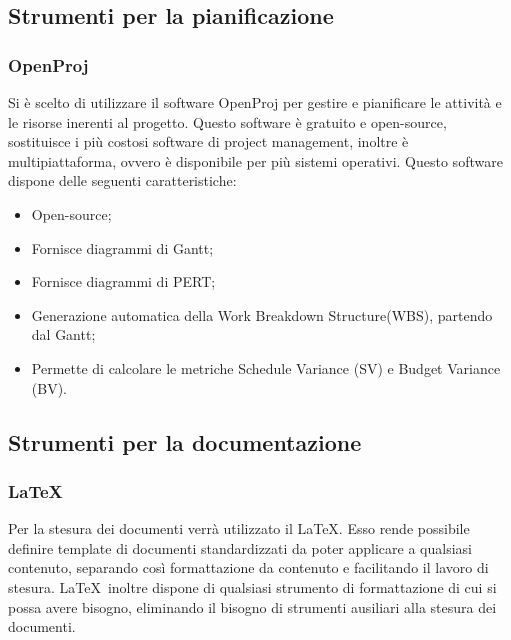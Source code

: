 


\subsection{Strumenti per la pianificazione}
\label{}
\subsubsection{OpenProj}
Si è scelto di utilizzare il software OpenProj per gestire e pianificare le attività e le risorse inerenti al progetto.
Questo software è gratuito e open-source, sostituisce i più costosi software di project management, inoltre è multipiattaforma, ovvero è disponibile per più sistemi operativi.
Questo software dispone delle seguenti caratteristiche:
\begin{itemize}
\item Open-source;
\item Fornisce diagrammi di Gantt;
\item Fornisce diagrammi di PERT;
\item Generazione automatica della Work Breakdown Structure(WBS), partendo dal Gantt;
\item Permette di calcolare le metriche Schedule Variance (SV) e Budget Variance (BV).
\end{itemize}
\label{}


\subsection{Strumenti per la documentazione}
\label{}
\subsubsection{LaTeX}
\label{5.7}
Per la stesura dei documenti verrà utilizzato il  \LaTeX. Esso rende possibile definire template di documenti standardizzati da poter applicare a qualsiasi contenuto, separando così formattazione da contenuto e facilitando il lavoro di stesura. \LaTeX\ inoltre dispone di qualsiasi strumento di formattazione di cui si possa avere bisogno, eliminando il bisogno di strumenti ausiliari alla stesura dei documenti.

